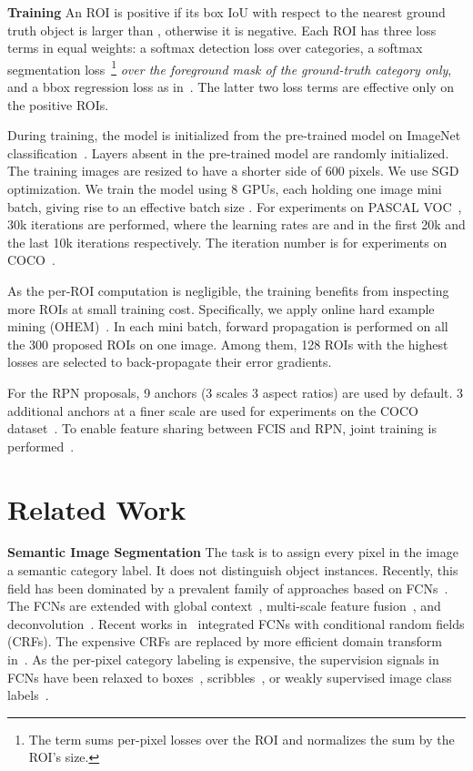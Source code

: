 \documentclass[10pt,twocolumn,letterpaper]{article}
\begin{document}
\textbf{Training}
An ROI is positive if its box IoU with respect to the nearest ground truth object is larger than , otherwise it is negative. Each ROI has three loss terms in equal weights: a softmax detection loss over  categories, a softmax segmentation loss~\footnote{The term sums per-pixel losses over the ROI and normalizes the sum by the ROI's size.} \emph{over the foreground mask of the ground-truth category only}, and a bbox regression loss as in~\cite{girshick2015fast}. The latter two loss terms are effective only on the positive ROIs.

During training, the model is initialized from the pre-trained model on ImageNet classification~\cite{he2016deep}. Layers absent in the pre-trained model are randomly initialized. The training images are resized to have a shorter side of 600 pixels. We use SGD optimization. We train the model using 8 GPUs, each holding one image mini batch, giving rise to an effective batch size . For experiments on PASCAL VOC~\cite{everingham2010pascal}, 30k iterations are performed, where the learning rates are  and  in the first 20k and the last 10k iterations respectively. The iteration number is  for experiments on COCO~\cite{lin2014coco}.

As the per-ROI computation is negligible, the training benefits from inspecting more ROIs at small training cost. Specifically, we apply online hard example mining (OHEM)~\cite{shrivastava2016training}. In each mini batch, forward propagation is performed on all the 300 proposed ROIs on one image. Among them, 128 ROIs with the highest losses are selected to back-propagate their error gradients.

For the RPN proposals, 9 anchors (3 scales  3 aspect ratios) are used by default. 3 additional anchors at a finer scale are used for experiments on the COCO dataset~\cite{lin2014coco}. To enable feature sharing between FCIS and RPN, joint training is performed~\cite{dai2016mnc,ren2016faster}.


\section{Related Work}

\textbf{Semantic Image Segmentation} The task is to assign every pixel in the image a semantic category label. It does not distinguish object instances. Recently, this field has been dominated by a prevalent family of approaches based on FCNs~\cite{long2015fully}. The FCNs are extended with global context~\cite{liu2016parsenet}, multi-scale feature fusion~\cite{chen2016attention}, and deconvolution~\cite{noh2015deconvolution}. Recent works in~\cite{chen2015semantic,zheng2015conditional,schwing2015fully,lin2016piecewise} integrated FCNs with conditional random fields (CRFs). The expensive CRFs are replaced by more efficient domain transform in~\cite{chen2016taskspecific}. As the per-pixel category labeling is expensive, the supervision signals in FCNs have been relaxed to boxes~\cite{dai2015boxsup}, scribbles~\cite{lin2016ScribbleSup}, or weakly supervised image class labels~\cite{hong2015decoupled,hong2016transferrable}.
\end{document}
